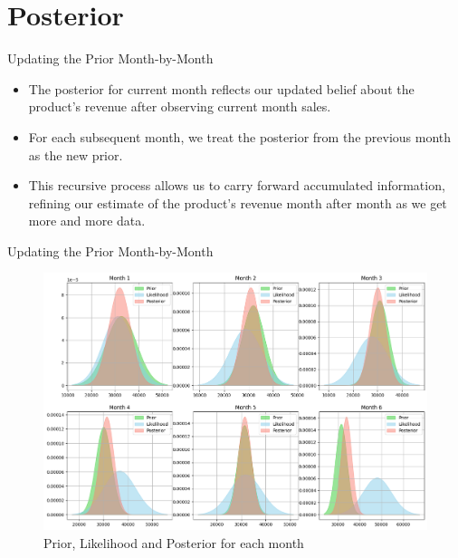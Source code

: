 \section{Posterior}

\begin{frame}{Updating the Prior Month-by-Month}

  \begin{itemize}
    \item The posterior for current month reflects our updated belief about the product's revenue after observing current month sales.
    \item For each subsequent month, we treat the posterior from the previous month as the new prior.
    \item This recursive process allows us to carry forward accumulated information, refining our estimate of the product's revenue month after month as we get more and more data.
  \end{itemize}
  
\end{frame}

\begin{frame}{Updating the Prior Month-by-Month}
    
\begin{figure}
  \centering
  \includegraphics[width=.7\linewidth]{../Report/images/months.png}
  \caption{Prior, Likelihood and Posterior for each month}
\end{figure}

\end{frame}

